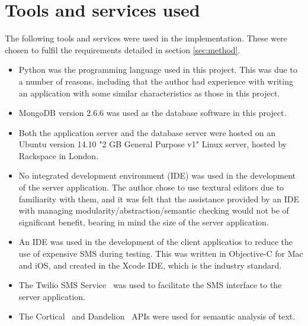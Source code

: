 \documentclass[authoryearcitations]{UoYCSproject}
\begin{document}
\section{Tools and services used}
\label{sec:toolsAndServices}
The following tools and services were used in the implementation. These were chosen to fulfil the requirements detailed in section \ref{sec:method}.
\begin{itemize}
  \item Python was the programming language used in this project. This was due to a number of reasons, including that the author had experience with writing an application with some similar characteristics as those in this project.
  \item MongoDB version 2.6.6 was used as the database software in this project.
  \item Both the application server and the database server were hosted on an Ubuntu version 14.10 "2 GB General Purpose v1" Linux server, hosted by Rackspace in London.
  \item No integrated development environment (IDE) was used in the development of the server application. The author chose to use textural editors due to familiarity with them, and it was felt that the assistance provided by an IDE with managing modularity/abstraction/semantic checking would not be of significant benefit, bearing in mind the size of the server application.
  \item An IDE was used in the development of the client applicatios to reduce the use of expensive SMS during testing. This was written in Objective-C for Mac and iOS, and created in the Xcode IDE, which is the industry standard.
  \item The Twilio SMS Service~\cite{serviceTwilio} was used to facilitate the SMS interface to the server application.
  \item The Cortical~\cite{serviceCorticalSim} and Dandelion~\cite{serviceDandelionSim, serviceDandelionNex} APIs were used for semantic analysis of text.
\end{itemize}
\end{document}
